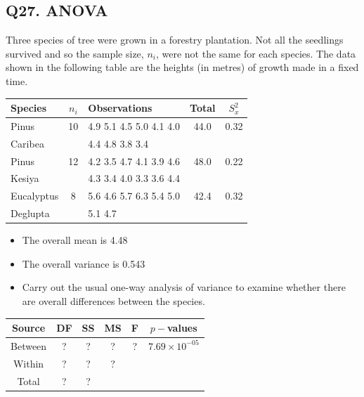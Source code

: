 \documentclass[a4paper,12pt]{article}
\begin{document}
\subsection*{Q27. ANOVA} 
Three species of tree were grown in a forestry plantation. Not all the
seedlings survived and so the sample size, $n_i$, were not the same for
each species. The data shown in the following table are the heights (in
metres) of growth made in a fixed time.

{
	\Large
	\begin{centering}
		\begin{tabular}{|l|c|l|c|c|}
			\hline
			Species & $n_i$ & Observations & Total & $S^2_x$ \\ \hline
			Pinus & 10 & 4.9 5.1 4.5 5.0 4.1 4.0  & 44.0 & 0.32\\ 
			Caribea  & & 4.4 4.8 3.8 3.4
			
			& &\\  \hline
			Pinus  & 12 & 4.2 3.5 4.7 4.1 3.9 4.6    &  48.0 & 0.22\\ 
			Kesiya & & 4.3 3.4 4.0 3.3 3.6 4.4 &&\\  \hline
			Eucalyptus 
			& 8 & 5.6 4.6 5.7 6.3 5.4 5.0  & 42.4 & 0.32
			\\ 
			Deglupta & & 5.1 4.7
			&&\\  \hline
		\end{tabular} 
	\end{centering}
}

\begin{itemize}
	\item The overall mean is 4.48
	\item The overall variance is 0.543
\end{itemize}

\begin{itemize}
	\item Carry out the usual one-way analysis of variance to examine whether
	there are overall differences between the species. 
\end{itemize}
{
	\large
	\begin{tabular}{|c|c|c|c|c|c|}
		\hline Source & DF & SS & MS & F & $p-$values \\ \hline
		\hline Between & \phantom{ma} ? \phantom{ma} & \phantom{mak} ? \phantom{mak} & \phantom{mak} ? \phantom{mak} & \phantom{mak} ? \phantom{mak} &  $7.69\times10^{-05}$ 	  \\ 
		\hline Within & \phantom{ma} ? \phantom{ma} &  \phantom{mak} ? \phantom{mak} &  \phantom{mak} ? \phantom{mak}&  \phantom{mak}&  \\ \hline
		\hline  Total & \phantom{ma} ? \phantom{ma} & \phantom{mak} ? \phantom{mak} &  &  &   \\ 
		\hline 
	\end{tabular} 
}
\end{document}
